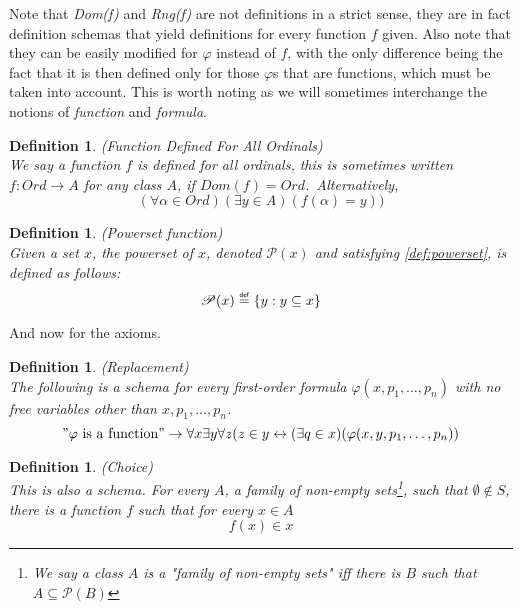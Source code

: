 \documentclass[12pt,a4paper]{article}
\newtheorem{definition}[theorem]{Definition}
\newcommand{\power}[1]{\ensuremath{\mathscr{P}} (#1)}
\renewcommand{\iff}{\leftrightarrow}
\newcommand{\then}{\rightarrow}
\newcommand\defeq{\mathrel{\overset{\makebox[0pt]{\mbox{\normalfont\tiny\sffamily def}}}{=}}}
\begin{document}
Note that \emph{Dom(f)} and \emph{Rng(f)} are not definitions in a strict sense, they are in fact definition schemas that yield definitions for every function $f$ given. Also note that they can be easily modified for $\varphi$ instead of $f$, with the only difference being the fact that it is then defined only for those $\varphi$s that are functions, which must be taken into account. This is worth noting as we will sometimes interchange the notions of \emph{function} and \emph{formula}.

\begin{definition}{(Function Defined For All Ordinals)}\label{def:function_dfao}\\
We say a function $f$ is \emph{defined for all ordinals}, this is sometimes written $f: Ord \then A$ for any class $A$, if $Dom(f) = Ord$.\
Alternatively,
\begin{equation}
(\forall \alpha \in Ord)(\exists y \in A)(f(\alpha) = y))
\end{equation}
\end{definition}

\begin{definition}{(Powerset function)}\\
Given a set $x$, the \emph{powerset of $x$}, denoted $\power{x}$ and satisfying \ref{def:powerset}, is defined as follows:
\begin{equation}
\power{x} \defeq \{y: y \subseteq x\}
\end{equation}
\end{definition}

And now for the axioms.

\begin{definition}{(Replacement)}\label{def:replacement}\\
The following is a schema for every first-order formula $\varphi(x, p_1, \ldots, p_n)$ with no free variables other than $x, p_1, \ldots, p_n$.
\begin{equation}
"\varphi\mbox{ is a function}"\then \forall x \exists y \forall z (z \in y \iff (\exists q \in x)(\varphi(x, y, p_1, \ldots, p_n))
\end{equation}
\end{definition}

\begin{definition}{(Choice)}\label{def:choice}\\
This is also a schema. For every $A$, a family of non-empty sets\footnote{We say a class $A$ is a "family of non-empty sets" iff there is $B$ such that $A \subseteq \power{B}$}, such that $\emptyset \not\in S$, there is a function $f$ such that for every $x \in A$
\begin{equation}
f(x) \in x
\end{equation}
\end{definition}
\end{document}
